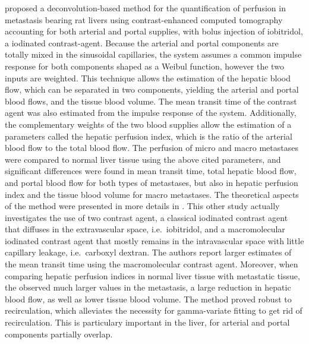 \citet{Cuenod:2001ef} proposed a deconvolution-based method for the quantification of perfusion in metastasis bearing rat livers using contrast-enhanced computed tomography accounting for both arterial and portal supplies, with bolus injection of iobitridol, a iodinated contrast-agent.
Because the arterial and portal components are totally mixed in the sinusoidal capillaries, the system assumes a common impulse response for both components shaped as a Weibul function, however the two inputs are weighted.
This technique allows the estimation of the hepatic blood flow, which can be separated in two components, yielding the arterial and portal blood flows, and the tissue blood volume.
The mean transit time of the contrast agent was also estimated from the impulse response of the system.
Additionally, the complementary weights of the two blood supplies allow the estimation of a parameters called the hepatic perfusion index, which is the ratio of the arterial blood flow to the total blood flow.
The perfusion of micro and macro metastases were compared to normal liver tissue using the above cited parameters, and significant differences were found in mean transit time, total hepatic blood flow, and portal blood flow for both types of metastases, but also in hepatic perfusion index and the tissue blood volume for macro metastases.
The theoretical aspects of the method were presented in more details in \cite{Cuenod:2002cm}.
This other study actually investigates the use of two contrast agent, a classical iodinated contrast agent that diffuses in the extravascular space, i.e.~iobitridol, and a macromolecular iodinated contrast agent that mostly remains in the intravascular space with little capillary leakage, i.e.~carboxyl dextran.
The authors report larger estimates of the mean transit time using the macromolecular contrast agent.
Moreover, when comparing hepatic perfusion indices in normal liver tissue with metastatic tissue, the observed much larger values in the metastasis, a large reduction in hepatic blood flow, as well as lower tissue blood volume.
The method proved robust to recirculation, which alleviates the necessity for gamma-variate fitting to get rid of recirculation. 
This is particulary important in the liver, for arterial and portal components partially overlap.


